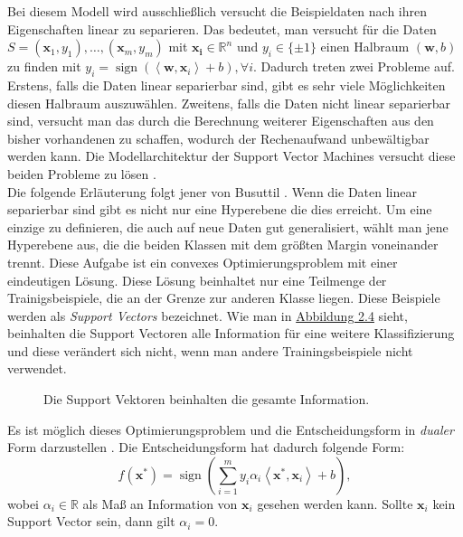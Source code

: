 Bei diesem Modell wird ausschlie{\ss}lich versucht die Beispieldaten nach ihren Eigenschaften linear zu separieren. Das bedeutet, man versucht f\"ur die 
Daten $S = (\mathbf{x}_1,y_1),\dots, (\mathbf{x}_m, y_m)$ mit $\mathbf{x_i} \in \mathbb{R}^n$ und $y_i \in \{\pm1\}$ einen Halbraum $(\mathbf{w},b)$ zu finden 
mit $y_i = \operatorname{sign}(\left\langle \mathbf{w},\mathbf{x}_i\right\rangle + b), \forall i$. Dadurch treten zwei Probleme auf. Erstens, falls die Daten linear separierbar sind, 
gibt es sehr viele M\"oglichkeiten diesen Halbraum auszuw\"ahlen. Zweitens, falls die Daten nicht linear separierbar sind, versucht man das durch die Berechnung 
weiterer Eigenschaften aus den bisher vorhandenen zu schaffen, wodurch der Rechenaufwand unbew\"altigbar werden kann. Die Modellarchitektur der Support Vector Machines versucht
diese beiden Probleme zu l\"osen \cite{shalev}. \\

Die folgende Erl\"auterung folgt jener von Busuttil \cite{SVM1}. Wenn die Daten linear separierbar sind gibt es nicht nur eine Hyperebene die dies erreicht.
Um eine einzige zu definieren, die auch auf neue Daten gut generalisiert, w\"ahlt man jene Hyperebene aus, die die beiden Klassen mit dem gr\"o{\ss}ten Margin 
voneinander trennt. Diese Aufgabe ist ein convexes Optimierungsproblem mit einer eindeutigen L\"osung. Diese L\"osung beinhaltet nur eine Teilmenge der Trainigsbeispiele, die 
an der Grenze zur anderen Klasse liegen. Diese Beispiele werden als \textit{Support Vectors} bezeichnet. Wie man in \hyperref[fig:svm2]{Abbildung 2.4} sieht, beinhalten die Support Vectoren
alle Information f\"ur eine weitere Klassifizierung und diese ver\"andert sich nicht, wenn man andere Trainingsbeispiele nicht verwendet. \\

\begin{figure}[ht]
  \label{fig:svm1}
  \begin{center}
    \begin{small}
    \end{small}
  \end{center}
  \caption[Darstellung der Support Vektoren]
    {Die Support Vektoren beinhalten die gesamte Information.}
\end{figure}



Es ist m\"oglich dieses Optimierungsproblem und die Entscheidungsform in \textit{dualer} Form darzustellen \cite{handson}. Die Entscheidungsform hat dadurch folgende Form:
$$ f(\mathbf{x^*}) = \operatorname{sign}(\sum_{i=1}^m y_i\alpha_i \left\langle \mathbf{x^*}, \mathbf{x}_i \right\rangle + b), $$
wobei $\alpha_i \in \mathbb{R}$ als Ma{\ss} an Information von $\mathbf{x}_i$ gesehen werden kann. Sollte $\mathbf{x}_i$ kein Support Vector sein, dann gilt $\alpha_i = 0$.\\

